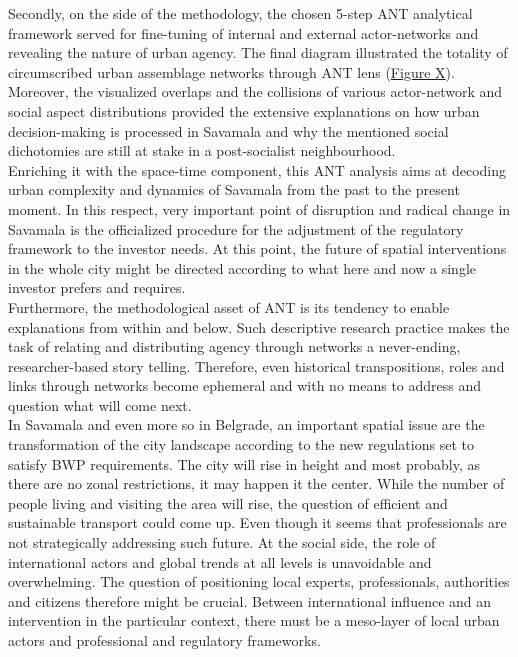 \documentclass[11pt]{report}
\begin{document}
Secondly, on the side of the methodology, the chosen 5-step ANT analytical framework served for fine-tuning of internal and external actor-networks and revealing the nature of urban agency.
The final diagram illustrated the totality of circumscribed urban assemblage networks through ANT lens (\href{}{Figure X}).
Moreover, the visualized overlaps and the collisions of various actor-network and social aspect distributions provided the extensive explanations on how urban decision-making is processed in Savamala and why the mentioned social dichotomies are still at stake in a post-socialist neighbourhood.
\\

Enriching it with the space-time component, this ANT analysis aims at decoding urban complexity and dynamics of Savamala from the past to the present moment.
In this respect, very important point of disruption and radical change in Savamala is the officialized procedure for the adjustment of the regulatory framework to the investor needs.
At this point, the future of spatial interventions in the whole city might be directed according to what here and now a single investor prefers and requires. 
\\

Furthermore, the methodological asset of ANT is its tendency to enable explanations from within and below.
Such descriptive research practice makes the task of relating and distributing agency through networks a never-ending, researcher-based story telling.
Therefore, even historical transpositions, roles and links through networks become ephemeral and with no means to address and question what will come next.
\\
 
In Savamala and even more so in Belgrade, an important spatial issue are the transformation of the city landscape according to the new regulations set to satisfy BWP requirements.
The city will rise in height and most probably, as there are no zonal restrictions, it may happen it the center. While the number of people living and visiting the area will rise, the question of efficient and sustainable transport could come up. 
Even though it seems that professionals are not strategically addressing such future.
At the social side, the role of international actors and global trends at all levels is unavoidable and overwhelming. 
The question of positioning local experts, professionals, authorities and citizens therefore might be crucial.
Between international influence and an intervention in the particular context, there must be a meso-layer of local urban actors and professional and regulatory frameworks.
\\
\end{document}
